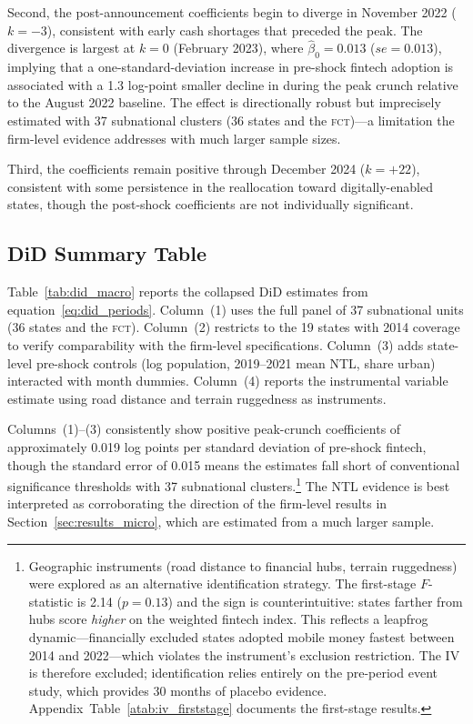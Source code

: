 Second, the post-announcement coefficients begin to diverge in November 2022
($k = -3$), consistent with early cash shortages that preceded the peak. The
divergence is largest at $k = 0$ (February 2023), where
$\hat\beta_0 = 0.013$ ($se = 0.013$), implying that a one-standard-deviation
increase in pre-shock fintech adoption is associated with a 1.3 log-point
smaller decline in \NTL{} during the peak crunch relative to the August 2022
baseline. The effect is directionally robust but imprecisely estimated with
37 subnational clusters (36 states and the \textsc{fct})---a limitation the firm-level evidence addresses with much
larger sample sizes.

Third, the coefficients remain positive through December 2024 ($k = +22$),
consistent with some persistence in the reallocation toward digitally-enabled
states, though the post-shock coefficients are not individually significant.

\subsection{DiD Summary Table}
\label{sub:did_table}

Table~\ref{tab:did_macro} reports the collapsed DiD estimates from
equation~\eqref{eq:did_periods}. Column~(1) uses the full panel of 37 subnational units (36 states and the \textsc{fct}).
Column~(2) restricts to the 19 states with \WBES{} 2014 coverage to verify
comparability with the firm-level specifications. Column~(3) adds
state-level pre-shock controls (log population, 2019--2021 mean NTL,
share urban) interacted with month dummies. Column~(4) reports the
instrumental variable estimate using road distance and terrain ruggedness
as instruments.



Columns~(1)--(3) consistently show positive peak-crunch coefficients of
approximately 0.019 log points per standard deviation of pre-shock fintech,
though the standard error of 0.015 means the estimates fall short of
conventional significance thresholds with 37 subnational clusters.\footnote{%
  Geographic instruments (road distance to financial hubs, terrain ruggedness)
  were explored as an alternative identification strategy. The first-stage
  $F$-statistic is 2.14 ($p = 0.13$) and the sign is counterintuitive:
  states farther from hubs score \emph{higher} on the weighted fintech index.
  This reflects a leapfrog dynamic---financially excluded states adopted
  mobile money fastest between 2014 and 2022---which violates the instrument's
  exclusion restriction. The IV is therefore excluded; identification relies
  entirely on the pre-period event study, which provides 30 months of
  placebo evidence. Appendix~Table~\ref{atab:iv_firststage} documents the
  first-stage results.}
The NTL evidence is best interpreted as corroborating the direction of the
firm-level results in Section~\ref{sec:results_micro}, which are estimated
from a much larger sample.
